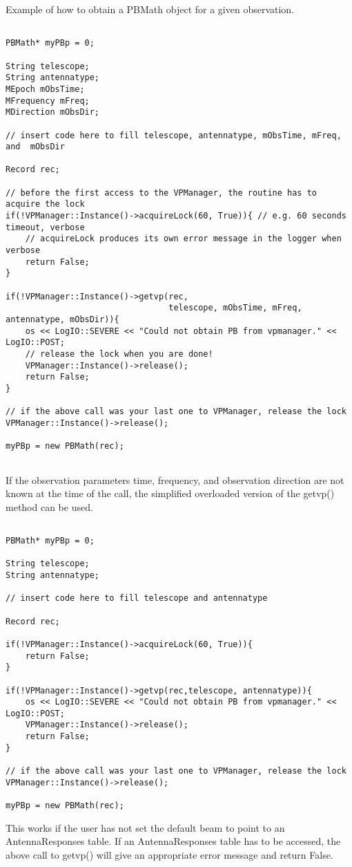 \documentclass[12pt]{article}
\begin{document}
Example of how to obtain a PBMath object for a given observation.
{\small
\begin{verbatim}

PBMath* myPBp = 0;	

String telescope; 
String antennatype;
MEpoch mObsTime;
MFrequency mFreq;
MDirection mObsDir;

// insert code here to fill telescope, antennatype, mObsTime, mFreq, and  mObsDir

Record rec;

// before the first access to the VPManager, the routine has to acquire the lock
if(!VPManager::Instance()->acquireLock(60, True)){ // e.g. 60 seconds timeout, verbose
    // acquireLock produces its own error message in the logger when verbose
    return False;
}

if(!VPManager::Instance()->getvp(rec,
                                 telescope, mObsTime, mFreq, antennatype, mObsDir)){
    os << LogIO::SEVERE << "Could not obtain PB from vpmanager." << LogIO::POST;
    // release the lock when you are done!
    VPManager::Instance()->release();
    return False;
}

// if the above call was your last one to VPManager, release the lock
VPManager::Instance()->release();

myPBp = new PBMath(rec);


\end{verbatim}
}
\newpage

If the observation parameters time, frequency, and observation direction are not known
at the time of the call, the simplified overloaded version of the getvp() method can
be used.
{\small
\begin{verbatim}

PBMath* myPBp = 0;	

String telescope; 
String antennatype;

// insert code here to fill telescope and antennatype

Record rec;

if(!VPManager::Instance()->acquireLock(60, True)){ 
    return False;
}

if(!VPManager::Instance()->getvp(rec,telescope, antennatype)){
    os << LogIO::SEVERE << "Could not obtain PB from vpmanager." << LogIO::POST;
    VPManager::Instance()->release();
    return False;
}

// if the above call was your last one to VPManager, release the lock
VPManager::Instance()->release();

myPBp = new PBMath(rec);

\end{verbatim}
}
This works if the user has not set the default beam to point to an AntennaResponses table.
If an AntennaResponses table has to be accessed, the above
call to getvp() will give an appropriate error message and return False.
\end{document}
